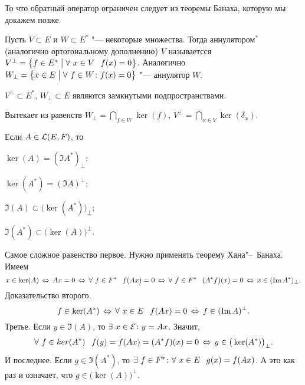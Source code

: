 То что обратный оператор ограничен следует из теоремы Банаха, которую мы докажем позже.
\begin{Def}
Пусть $V\subset E$ и $W\subset E^*$ "--- некоторые множества. Тогда аннулятором${}^*$ (аналогично ортогональному дополнению) $V$ называетсся $V^\perp = \big\{f\in E^*\bigm|\forall\ x\in V\pau f(x)=0\big\}$. Аналогично $W_\perp = \big\{x\in E\bigm|\forall\ f\in W\colon f(x)=0\big\}$ "--- аннулятор $W$.
\end{Def}
\begin{Lem}
  $V^\perp\subset E^*$, $W_\perp\subset E$ являются замкнутыми подпространствами.
\end{Lem}
\begin{Proof}
  Вытекает из равенств $W_\perp = \bigcap\limits_{f\in W}\ker(f)$, $V^\perp = \bigcap\limits_{x\in V}\ker(\delta_x)$.
\end{Proof}
\begin{The}
  Если $A\in \mathcal L(E,F)$, то
\begin{roItems}
\item  $\ker(A) = (\Im A^*)_\perp$;
\item $\ker(A^*) = (\Im A)^\perp$;
\item $\Im(A)\subset \big(\ker(A^*)\big)_\perp$;
\item $\Im(A^*)\subset \big(\ker(A)\big)^\perp$.
\end{roItems}
\end{The}
\begin{Proof}
  Самое сложное равенство первое. Нужно применять теорему Хана"--~Банаха. Имеем
\[
  x\in\ker(A)\,\Leftrightarrow\, Ax=0\,\Leftrightarrow\, \forall\ f\in F^*\hskip .75em plus.1em minus.08em\relax f(Ax) = 0
  \,\Leftrightarrow\, \forall\ f\in F^*\hskip .75em plus.1em minus.08em\relax (A^*f)(x) = 0\,\Leftrightarrow\, x\in (\mathop{\mathrm{Im}} A^*)_\perp.
\]
Доказательство второго.
\[
  f\in\ker(A^*)\,\Leftrightarrow\, \forall\ x\in E\hskip .75em plus.1em minus.08em\relax f(Ax) = 0 \,\Leftrightarrow\,
  f\in (\mathop{\mathrm{Im}} A)^\perp.
\]
Третье. Если $y\in\Im(A)$, то $\exists\ x\in\mathcal E\colon y=Ax$. Значит, 
\[
  \forall\ f\in ker(A^*)\hskip .75em plus.1em minus.08em\relax f(y) = f(Ax) = (A^*f)(x) = 0 \,\Leftrightarrow\, y\in \big(\ker(A^*)\big)_\perp.
\]
И последнее. Если $g\in \Im(A^*)$, то $\exists\ f\in F^*\colon \forall\ x\in E\pau g(x) = f(Ax)$. А это как раз и означает, что $g\in \big(\ker(A)\big)^\perp$.
\end{Proof}

